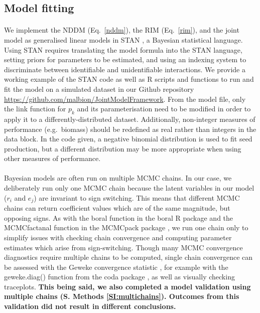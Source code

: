 \documentclass[a4,12pt]{article}
\begin{document}
\begin{refsection}
    \subsection{Model fitting}

        \paragraph{}        
        We implement the NDDM (Eq.~\ref{nddm}), the RIM (Eq.~\ref{rim}), and the joint model as generalised linear models in STAN \parencite{Carpenter2017}, a Bayesian statistical language. Using STAN requires translating the model formula into the STAN language, setting priors for parameters to be estimated, and using an indexing system to discriminate between identifiable and unidentifiable interactions. We provide a working example of the STAN code as well as R scripts and functions to run and fit the model on a simulated dataset in our Github repository \url{https://github.com/malbion/JointModelFramework}.
        From the model file, only the link function for $p_k$ and its parameterisation need to be modified in order to apply it to a differently-distributed dataset. Additionally, non-integer measures of performance (e.g.\ biomass) should be redefined as real rather than integers in the data block. In the code given, a negative binomial distribution is used to fit seed production, but a different distribution may be more appropriate when using other measures of performance.   

        \paragraph{}
        Bayesian models are often run on multiple MCMC chains. In our case, we deliberately run only one MCMC chain because the latent variables in our model ($r_i$ and $e_j$) are invariant to sign switching. This means that different MCMC chains can return coefficient values which are of the same magnitude, but opposing signs. As with the boral function in the boral R package \parencite{Hui2021} and the MCMCfactanal function in the MCMCpack package \parencite{Martin2011}, we run one chain only to simplify issues with checking chain convergence and computing parameter estimates which arise from sign-switching. Though many MCMC convergence diagnostics require multiple chains to be computed, single chain convergence can be assessed with the Geweke convergence statistic \parencite{Geweke1992}, for example with the geweke.diag() function from the coda package \parencite{Plummer2006}, as well as visually checking traceplots. \textbf{This being said, we also completed a model validation using multiple chains (S. Methods \ref{SI:multichains}). Outcomes from this validation did not result in different conclusions.}


\end{refsection}
\end{document}

